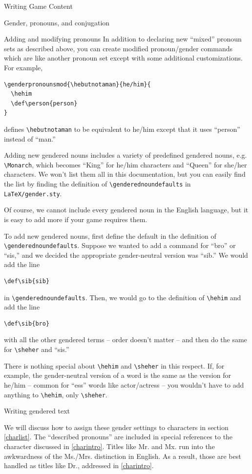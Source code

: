 \documentclass[sheet]{GameTexBase}
\newcommand{\pronounfile}{\lstinline|LaTeX/gender.sty|}
\begin{document}
\begin{section}{Writing Game Content}
\begin{subsection}{Gender, pronouns, and conjugation}
\begin{subsubsection}{Adding and modifying pronouns}
In addition to declaring new ``mixed'' pronoun sets as described above, you can create modified pronoun/gender commands which are like another pronoun set except with some additional customizations.  For example,
\begin{verbatim}
\genderpronounsmod{\hebutnotaman}{he/him}{
  \hehim
  \def\person{person}
}
\end{verbatim}
defines \lstinline|\hebutnotaman| to be equivalent to he/him except that it uses ``person'' instead of ``man.''
\end{subsubsection}
\begin{subsubsection}{Adding new gendered nouns}
\lrstex{} includes a variety of predefined gendered nouns, e.g. \lstinline|\Monarch|, which becomes ``King'' for he/him characters and ``Queen'' for she/her characters.  We won't list them all in this documentation, but you can easily find the list by finding the definition of \lstinline|\genderednoundefaults| in \pronounfile{}.

Of course, we cannot include every gendered noun in the English language, but it is easy to add more if your game requires them.

To add new gendered nouns, first define the default in the definition of \lstinline|\genderednoundefaults|.  Suppose we wanted to add a command for ``bro'' or ``sis,'' and we decided the appropriate gender-neutral version was ``sib.''
We would add the line
\begin{verbatim}
\def\sib{sib}
\end{verbatim}
in \lstinline|\genderednoundefaults|.  Then, we would go to the definition of \lstinline|\hehim| and add the line
\begin{verbatim}
\def\sib{bro}
\end{verbatim}
with all the other gendered terms -- order doesn't matter -- and then do the same for \lstinline|\sheher| and ``sis.''

There is nothing special about \lstinline|\hehim| and \lstinline|\sheher| in this respect.  If, for example, the gender-neutral version of a word is the same as the version for he/him -- common for ``ess'' words like actor/actress -- you wouldn't have to add anything to \lstinline|\hehim|, only \lstinline|\sheher|.
\end{subsubsection}
\begin{subsubsection}{Writing gendered text}

We will discuss how to assign these gender settings to characters in section \ref{charlist}.  The ``described pronouns'' are included in special references to the character discussed in \ref{charintro}.
Titles like Mr. and Mx. run into the awkwardness of the Ms./Mrs. distinction in English.  As a result, those are best handled as titles like Dr., addressed in \ref{charintro}.


\end{subsubsection}
\end{subsection}
\end{section}
\end{document}
